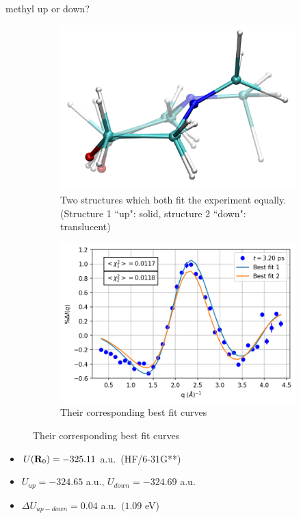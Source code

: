\documentclass{beamer}
\begin{document}
\begin{frame}{methyl up or down?}
	\vspace{-5mm}
	\begin{figure}
		\centering
		\begin{subfigure}[b]{0.45\textwidth}
			\centering
			\includegraphics[width=\textwidth]{allmodes_1m_2m_frame71_comparison.png}
			\caption{Two structures which both fit the experiment equally. (Structure 1 ``up": solid, structure 2 ``down": translucent)}
		\end{subfigure}
		\begin{subfigure}[b]{0.45\textwidth}
			\centering
			\includegraphics[width=\textwidth]{figures/2000000_allmodes_3.20_comparison.png}
			\caption{Their corresponding best fit curves}
		\end{subfigure}
	\end{figure}
	\begin{itemize}
		\item $U({\bf R}_0)=-325.11$ a.u.\ (HF/6-31G**)
		\item $U_{up}=-324.65$ a.u., $U_{down}=-324.69$ a.u.
		\item $\Delta U_{up-down} = 0.04$ a.u.\ $(1.09$ eV)
	\end{itemize}

\end{frame}
\end{document}
